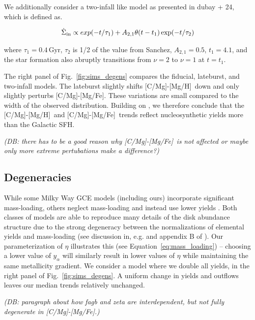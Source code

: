 \documentclass[fleqn,
usenatbib]{mnras}
\newcommand{\gce}{GCE}
\newcommand{\caah}{[C/Mg]-[Mg/H]}
\newcommand{\caafe}{[C/Mg]-[Mg/Fe]}
\newcommand{\dbadd}[1]{{\color{Thistle} #1}}
\newcommand{\dbnote}[1]{ {\color{Thistle} \textit{\small (DB: #1)}} }
\begin{document}
We additionally consider a two-infall like model as presented in \dbadd{dubay + 24}, which is defined as.

\begin{equation}\label{twoinfall}
\dot{\Sigma}_{\rm in} \propto exp(-t/\tau_1) + A_{2,1} \theta(t - t_{1}) \exp(-t/\tau_2)
\end{equation}

where $\tau_1=0.4\,$Gyr, $\tau_2$ is 1/2 of the value from Sanchez, $A_{2,1}=0.5$, $t_1=4.1$, and the star formation also abruptly transitions from $\nu=2$ to $\nu=1$ at $t=t_1$.

The right panel of Fig.~\ref{fig:sims_degens} compares the fiducial, lateburst, and two-infall models. The lateburst slightly shifts \caah\ down and only slightly perturbs \caafe. These variations are small compared to the width of the observed distribution. 
Building on \citet{james+23}, we therefore conclude that the \caah\ and \caafe\ trends reflect nucleosynthetic yields more than the Galactic SFH. 

\dbnote{there has to be a good reason why \caafe\ is not affected or maybe only more extreme pertubations make a difference?}



\subsection{Degeneracies} \label{sec:outflows}

While some Milky Way \gce{} models (including ours) incorporate significant mass-loading, others
neglect mass-loading and instead use lower yields \citep[e.g.][]{MCM13, MCM14, spitoni19, spitoni20, spitoni21}.
Both classes of models are able to reproduce many details of the disk abundance structure due to the strong degeneracy between the normalizations of elemental yields and mass-loading (see discussion in, e.g. \citealt{sandford+24} and appendix B of \citealt{james+23}). 
Our parameterization of $\eta$ illustrates this (see Equation~\ref{eq:mass_loading}) -- choosing a lower value of $y_{\alpha}$ will similarly result in lower values of $\eta$ while maintaining the same metallicity gradient. 
We consider a model where we double all yields, in the right panel of Fig.~\ref{fig:sims_degens}. A uniform change in yields and outflows leaves our median trends relatively unchanged. 

\dbnote{paragraph about how fagb and zeta are interdependent, but not fully degenerate in \caafe.}
\end{document}
